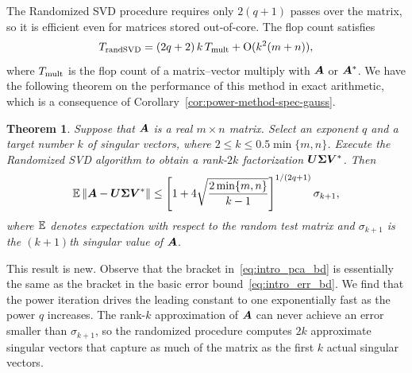 \documentclass{article}
\newtheorem{theorem}{Theorem}
\begin{document}
The Randomized SVD procedure requires %
only $2(q+1)$ passes over the matrix, so it is
efficient even for matrices stored out-of-core.
The flop count satisfies
$$
T_{\rm rand SVD} = (2q+2)\,k \, T_{\rm mult} + \mathrm{O}(k^2 (m + n)),
$$
where $T_{\rm mult}$ is the flop count of a matrix--vector multiply
with $\bm{A}$ or $\bm{A}^*$.
We have the following theorem on the performance of this method
in exact arithmetic, which is a consequence of
Corollary~\ref{cor:power-method-spec-gauss}.


\lsp

\begin{theorem}
Suppose that $\bm{A}$ is a real $m \times n$ matrix.  Select
an exponent $q$ and a target number $k$ of singular vectors,
where $2 \leq k \leq 0.5 \min\{m,n\}$.
Execute the Randomized SVD algorithm to obtain a rank-$2k$
factorization $\bm{U\Sigma V}^*$.  Then
\begin{equation}
\label{eq:intro_pca_bd}
\operatorname{\mathbb{E}} \left\Vert { \bm{A} - \bm{U\Sigma V}^*} \right\Vert
    \leq \left[ 1 + 4 \sqrt{\frac{2\min\{m,n\}}{k-1}} \right]^{1/(2q+1)} \sigma_{k+1},
\end{equation}
where $\operatorname{\mathbb{E}}$ denotes expectation with respect to the
random test matrix and $\sigma_{k+1}$ is the $(k+1)$th
singular value of $\bm{A}$.
\end{theorem}

\lsp

This result is new.
Observe that the bracket in~\eqref{eq:intro_pca_bd} is essentially
the same as the bracket in the basic error bound~\eqref{eq:intro_err_bd}.
We find that the power iteration drives the leading constant to one
exponentially fast as the power $q$ increases.
The rank-$k$ approximation of $\bm{A}$ can never achieve an error
smaller than $\sigma_{k+1}$, so the randomized procedure computes $2k$
approximate singular vectors that capture as much of the matrix
as the first $k$ actual singular vectors.
\end{document}
